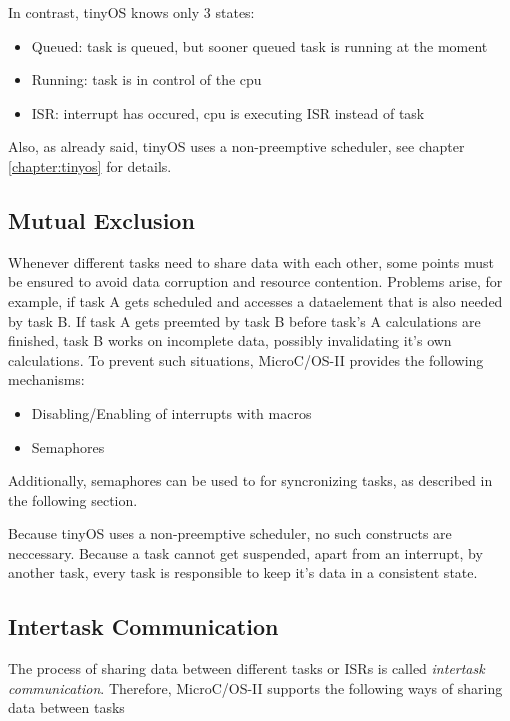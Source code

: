 In contrast, tinyOS knows only 3 states:

\begin{itemize}
 \item Queued: task is queued, but sooner queued task is running at the moment 
 \item Running: task is in control of the cpu
 \item ISR: interrupt has occured, cpu is executing ISR instead of task
\end{itemize}

Also, as already said, tinyOS uses a non-preemptive scheduler, see chapter \ref{chapter:tinyos} for details.

\subsection{Mutual Exclusion}

Whenever different tasks need to share data with each other, some points must be ensured to avoid data corruption and resource contention. Problems arise, for example, if task A gets scheduled and accesses a dataelement that is also needed by task B. If task A gets preemted by task B before task's A calculations are finished, task B works on incomplete data, possibly invalidating it's own calculations. To prevent such situations, MicroC/OS-II provides the following mechanisms:

\begin{itemize}
 \item Disabling/Enabling of interrupts with macros 
 \item Semaphores
\end{itemize}

Additionally, semaphores can be used to for syncronizing tasks, as described in the following section.

Because tinyOS uses a non-preemptive scheduler, no such constructs are neccessary. Because a task cannot get suspended, apart from an interrupt, by another task, every task is responsible to keep it's data in a consistent state.

\subsection{Intertask Communication}

The process of sharing data between different tasks or ISRs is called \textit{intertask communication}. Therefore, MicroC/OS-II supports the following ways of sharing data between tasks

